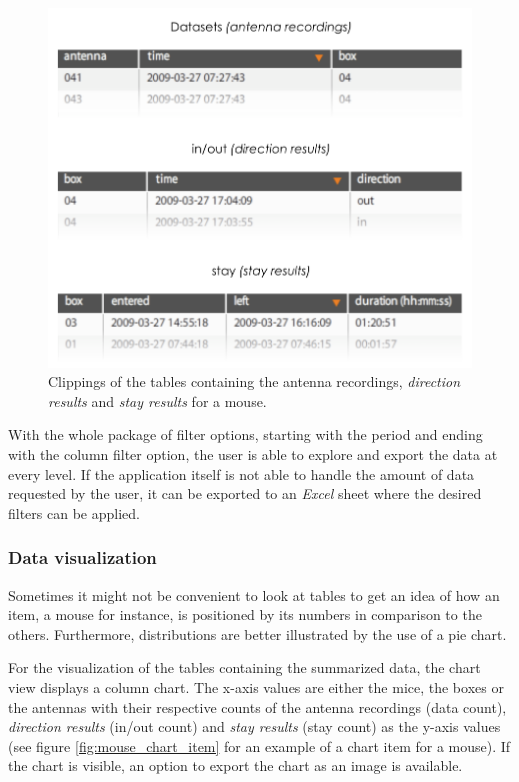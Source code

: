 \begin{figure}[htpb]
\begin{center}
  \includegraphics[width=.75\textwidth]{assets/pdf/overview_data.pdf}
  \caption{Clippings of the tables containing the antenna recordings, \textit{direction results} and \textit{stay results} for a mouse.}
  \label{fig:overview_data}
\end{center}
\end{figure}  

With the whole package of filter options, starting with the period and ending with the column filter option, the user is able to explore and export the data at every level. If the application itself is not able to handle the amount of data requested by the user, it can be exported to an \textit{Excel} sheet where the desired filters can be applied.       

\subsubsection{Data visualization}
\label{subsubsec:datavis}

Sometimes it might not be convenient to look at tables to get an idea of how an item, a mouse for instance, is positioned by its numbers in comparison to the others. Furthermore, distributions are better illustrated by the use of a pie chart. 

For the visualization of the tables containing the summarized data, the chart view displays a column chart. The x-axis values are either the mice, the boxes or the antennas with their respective counts of the antenna recordings (data count), \textit{direction results} (in/out count) and \textit{stay results} (stay count) as the y-axis values (see figure \ref{fig:mouse_chart_item} for an example of a chart item for a mouse). If the chart is visible, an option to export the chart as an image is available.

